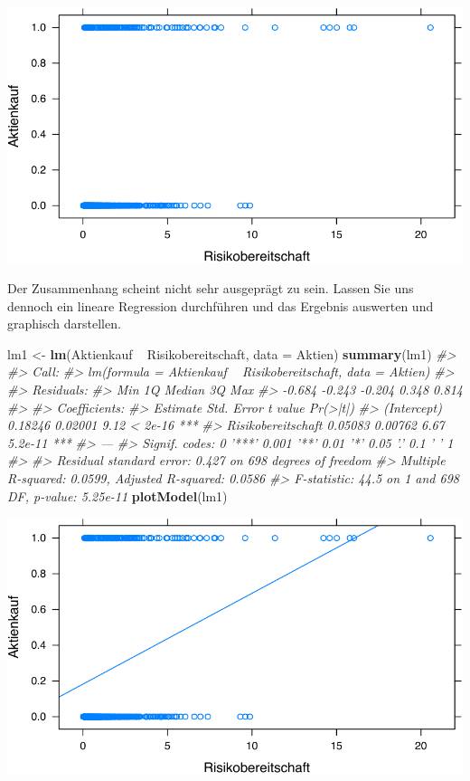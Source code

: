 \documentclass[12pt,]{book}
\newenvironment{Shaded}{\begin{snugshade}}{\end{snugshade}}
\newcommand{\KeywordTok}[1]{\textcolor[rgb]{0.13,0.29,0.53}{\textbf{{#1}}}}
\newcommand{\DataTypeTok}[1]{\textcolor[rgb]{0.13,0.29,0.53}{{#1}}}
\newcommand{\StringTok}[1]{\textcolor[rgb]{0.31,0.60,0.02}{{#1}}}
\newcommand{\CommentTok}[1]{\textcolor[rgb]{0.56,0.35,0.01}{\textit{{#1}}}}
\newcommand{\NormalTok}[1]{{#1}}
\begin{document}
\begin{center}\includegraphics[width=0.7\linewidth]{072_klassifizierende_Regression_files/figure-latex/unnamed-chunk-4-1} \end{center}

Der Zusammenhang scheint nicht sehr ausgeprägt zu sein. Lassen Sie uns
dennoch ein lineare Regression durchführen und das Ergebnis auswerten
und graphisch darstellen.

\begin{Shaded}
\begin{Highlighting}[]
\NormalTok{lm1 <-}\StringTok{ }\KeywordTok{lm}\NormalTok{(Aktienkauf ~}\StringTok{ }\NormalTok{Risikobereitschaft, }\DataTypeTok{data =} \NormalTok{Aktien)}
\KeywordTok{summary}\NormalTok{(lm1)}
\CommentTok{#> }
\CommentTok{#> Call:}
\CommentTok{#> lm(formula = Aktienkauf ~ Risikobereitschaft, data = Aktien)}
\CommentTok{#> }
\CommentTok{#> Residuals:}
\CommentTok{#>    Min     1Q Median     3Q    Max }
\CommentTok{#> -0.684 -0.243 -0.204  0.348  0.814 }
\CommentTok{#> }
\CommentTok{#> Coefficients:}
\CommentTok{#>                    Estimate Std. Error t value Pr(>|t|)    }
\CommentTok{#> (Intercept)         0.18246    0.02001    9.12  < 2e-16 ***}
\CommentTok{#> Risikobereitschaft  0.05083    0.00762    6.67  5.2e-11 ***}
\CommentTok{#> ---}
\CommentTok{#> Signif. codes:  0 '***' 0.001 '**' 0.01 '*' 0.05 '.' 0.1 ' ' 1}
\CommentTok{#> }
\CommentTok{#> Residual standard error: 0.427 on 698 degrees of freedom}
\CommentTok{#> Multiple R-squared:  0.0599, Adjusted R-squared:  0.0586 }
\CommentTok{#> F-statistic: 44.5 on 1 and 698 DF,  p-value: 5.25e-11}
\KeywordTok{plotModel}\NormalTok{(lm1)}
\end{Highlighting}
\end{Shaded}

\begin{center}\includegraphics[width=0.7\linewidth]{072_klassifizierende_Regression_files/figure-latex/unnamed-chunk-5-1} \end{center}
\end{document}
